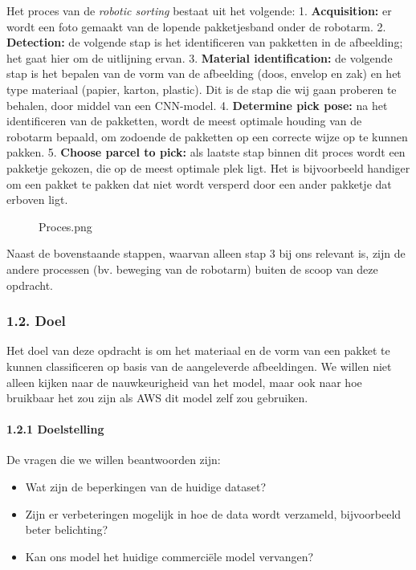 \documentclass[11pt]{article}
\providecommand{\tightlist}{%
      \setlength{\itemsep}{0pt}\setlength{\parskip}{0pt}}
\begin{document}
Het proces van de \emph{robotic sorting} bestaat uit het volgende: 1.
\textbf{Acquisition:} er wordt een foto gemaakt van de lopende
pakketjesband onder de robotarm. 2. \textbf{Detection:} de volgende stap
is het identificeren van pakketten in de afbeelding; het gaat hier om de
uitlijning ervan. 3. \textbf{Material identification:} de volgende stap
is het bepalen van de vorm van de afbeelding (doos, envelop en zak) en
het type materiaal (papier, karton, plastic). Dit is de stap die wij
gaan proberen te behalen, door middel van een CNN-model. 4.
\textbf{Determine pick pose:} na het identificeren van de pakketten,
wordt de meest optimale houding van de robotarm bepaald, om zodoende de
pakketten op een correcte wijze op te kunnen pakken. 5. \textbf{Choose
parcel to pick:} als laatste stap binnen dit proces wordt een pakketje
gekozen, die op de meest optimale plek ligt. Het is bijvoorbeeld
handiger om een pakket te pakken dat niet wordt versperd door een ander
pakketje dat erboven ligt.

\begin{figure}
\centering
{}
\caption{Proces.png}
\end{figure}

Naast de bovenstaande stappen, waarvan alleen stap 3 bij ons relevant
is, zijn de andere processen (bv. beweging van de robotarm) buiten de
scoop van deze opdracht.

\subsubsection{1.2. Doel}\label{doel}

Het doel van deze opdracht is om het materiaal en de vorm van een pakket
te kunnen classificeren op basis van de aangeleverde afbeeldingen. We
willen niet alleen kijken naar de nauwkeurigheid van het model, maar ook
naar hoe bruikbaar het zou zijn als AWS dit model zelf zou gebruiken.

\paragraph{1.2.1 Doelstelling}\label{doelstelling}

De vragen die we willen beantwoorden zijn:

\begin{itemize}
\tightlist
\item
  Wat zijn de beperkingen van de huidige dataset?
\item
  Zijn er verbeteringen mogelijk in hoe de data wordt verzameld,
  bijvoorbeeld beter belichting?
\item
  Kan ons model het huidige commerciële model vervangen?
\end{itemize}
\end{document}
